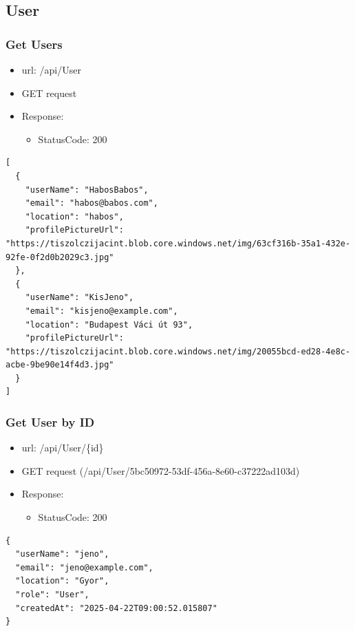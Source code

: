 \documentclass[11pt]{article}
\begin{document}
\subsection{User}
\label{sec:org88878da}
\subsubsection{Get Users}
\label{sec:org5515a16}
\begin{itemize}
\item url: /api/User
\item GET request
\item Response:
\begin{itemize}
\item StatusCode: 200
\end{itemize}
\end{itemize}
\begin{verbatim}
[
  {
    "userName": "HabosBabos",
    "email": "habos@babos.com",
    "location": "habos",
    "profilePictureUrl": "https://tiszolczijacint.blob.core.windows.net/img/63cf316b-35a1-432e-92fe-0f2d0b2029c3.jpg"
  },
  {
    "userName": "KisJeno",
    "email": "kisjeno@example.com",
    "location": "Budapest Váci út 93",
    "profilePictureUrl": "https://tiszolczijacint.blob.core.windows.net/img/20055bcd-ed28-4e8c-acbe-9be90e14f4d3.jpg"
  }
]
\end{verbatim}
\subsubsection{Get User by ID}
\label{sec:org959e21e}
\begin{itemize}
\item url: /api/User/\{id\}
\item GET request (/api/User/5bc50972-53df-456a-8e60-c37222ad103d)
\item Response:
\begin{itemize}
\item StatusCode: 200
\end{itemize}
\end{itemize}
\begin{verbatim}
{
  "userName": "jeno",
  "email": "jeno@example.com",
  "location": "Gyor",
  "role": "User",
  "createdAt": "2025-04-22T09:00:52.015807"
}
\end{verbatim}
\end{document}
